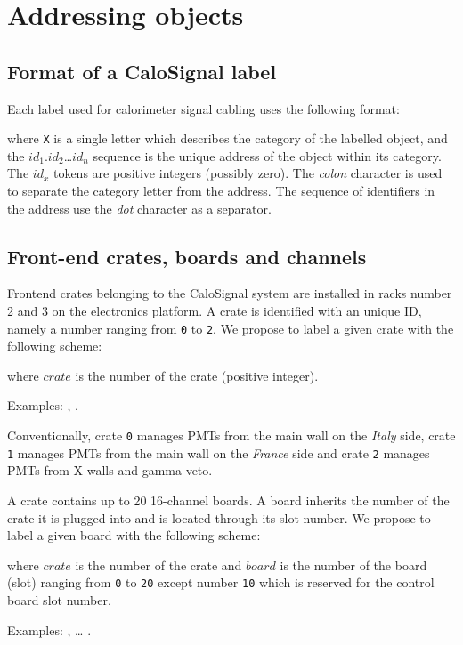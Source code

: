 \section{Addressing objects}

\subsection{Format of a CaloSignal label}

Each label used for calorimeter signal cabling uses  the following
format:

\begin{center}
\end{center}
\noindent  where \texttt{X}  is a  single letter  which describes  the
category  of the  labelled  object,  and the  $id_1$.$id_2$\dots$id_n$
sequence is the unique address of the object within its category.  The
$id_x$ tokens are positive integers (possibly zero).  The \emph{colon}
character is  used to separate  the category letter from  the address.
The  sequence  of  identifiers  in  the  address  use  the  \emph{dot}
character as a separator.


\subsection{Front-end crates, boards and channels}

Frontend crates  belonging to the  CaloSignal system are  installed in
racks  number  2 and  3  on  the  electronics  platform.  A  crate  is
identified with an unique ID,  namely a number ranging from \texttt{0}
to \texttt{2}.  We  propose to label a given crate  with the following
scheme:
\begin{center}
 \end{center}
where \texttt{$crate$} is the number of the crate (positive integer).
\vskip     10pt    \par\noindent     Examples:    ,
.   \par Conventionally,  crate \texttt{0}  manages
PMTs from  the main  wall on the  \emph{Italy} side,  crate \texttt{1}
manages PMTs  from the main wall  on the \emph{France} side  and crate
\texttt{2} manages PMTs from X-walls and gamma veto.

 \vskip 10pt  A crate contains  up to  20 16-channel boards.   A board
 inherits the  number of the crate  it is plugged into  and is located
 through its slot number.  We propose  to label a given board with the
 following scheme:
\begin{center}
 \end{center}
where \texttt{$crate$} is the number of the crate and \texttt{$board$}
is  the  number  of  the  board  (slot)  ranging  from  \texttt{0}  to
\texttt{20}  except  number  \texttt{10}  which is  reserved  for  the
control board slot number.
\vskip 10pt
\par\noindent Examples: ,  \dots
{}.

